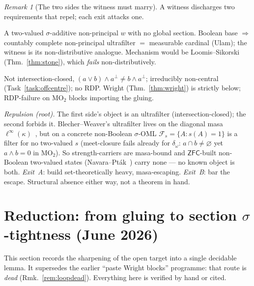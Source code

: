 \documentclass[11pt]{article}
\theoremstyle{definition}
\theoremstyle{remark}
\newtheorem{remark}[theorem]{Remark}
\newcommand{\MOO}{\mathrm{MO}_2}
\begin{document}
\begin{remark}[The two sides the witness must marry]\label{rem:marriage}
A witness discharges two requirements that repel; each exit attacks one.
\begin{description}[noitemsep,topsep=2pt]
  \item[Set-theoretic (Exit~A target).] A two-valued $\sigma$-additive non-principal
    $w$ with no global section. Boolean base $\Rightarrow$ countably complete
    non-principal ultrafilter $=$ measurable cardinal (Ulam); the witness is its
    non-distributive analogue. Mechanism would be Loomis--Sikorski
    (Thm.~\ref{thm:stone}), which \emph{fails} non-distributively.
  \item[Order-theoretic (carrier constraint).] Not intersection-closed,
    $(a\vee b)\wedge a^{\perp}\neq b\wedge a^{\perp}$; irreducibly non-central
    (Task~\ref{task:offcentre}); no RDP. Wright (Thm.~\ref{thm:wright}) is strictly
    below; RDP-failure on $\MOO$ blocks importing the gluing.
\end{description}
\noindent\emph{Repulsion (root).} The first side's object is an ultrafilter
(intersection-closed); the second forbids it. Blecher--Weaver's ultrafilter lives on
the diagonal masa $\ell^\infty(\kappa)$~\cite{BlecherWeaver2017}, but on a concrete
non-Boolean $\sigma$-OML $\mathcal F_s=\{A:s(A)=1\}$ is a filter for no two-valued $s$
(meet-closure fails already for $\delta_\omega$: $a\cap b\neq\varnothing$ yet
$a\wedge b=0$ in $\MOO$). So strength-carriers are masa-bound and $\mathsf{ZFC}$-built
non-Boolean two-valued states (Navara--Pt\'ak~\cite{NavaraPtak1983}) carry none --- no
known object is both. \emph{Exit~A}: build set-theoretically heavy, masa-escaping.
\emph{Exit~B}: bar the escape. Structural absence either way, not a theorem in hand.
\end{remark}

\section{Reduction: from gluing to section $\sigma$-tightness (June 2026)}\label{sec:reduction}

This section records the sharpening of the open target into a single decidable
lemma. It supersedes the earlier ``paste Wright blocks'' programme: that route is
\emph{dead} (Rmk.~\ref{rem:loopdead}). Everything here is verified by hand or cited.
\end{document}
